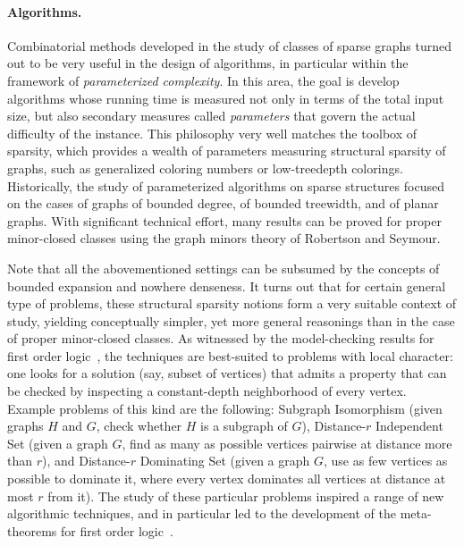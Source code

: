 \paragraph*{Algorithms.} 
Combinatorial methods developed in the study of classes of sparse graphs turned out to be very useful in the design of algorithms, in particular within the framework of {\em{parameterized complexity}}.
In this area, the goal is develop algorithms whose running time is measured not only in terms of the total input size, but also secondary measures called {\em{parameters}} that govern the actual 
difficulty of the instance. This philosophy very well matches the toolbox of sparsity, which provides a wealth of parameters measuring structural sparsity of graphs, such as generalized coloring numbers or
low-treedepth colorings. Historically, the study of parameterized algorithms on sparse structures focused on the cases of graphs of bounded degree, of bounded treewidth, and of planar graphs. 
With significant technical effort, many results can be proved for proper minor-closed classes using the graph minors theory of Robertson and Seymour. 

Note that all the abovementioned settings can be subsumed by the concepts of bounded expansion and nowhere denseness.
It turns out that for certain general type of problems, these structural sparsity notions form a very suitable context of study, yielding conceptually simpler, yet more general reasonings than 
in the case of proper minor-closed classes. As witnessed by the model-checking results for first order logic~\cite{DvorakKT13,grohe2017deciding}, the techniques are best-suited to problems with local character:
one looks for a solution (say, subset of vertices) that admits a property that can be checked by inspecting a constant-depth neighborhood of every vertex.
Example problems of this kind are the following: Subgraph Isomorphism (given graphs $H$ and $G$, check whether $H$ is a subgraph of $G$), Distance-$r$ Independent Set (given a graph $G$, find as many as possible
vertices pairwise at distance more than $r$), and Distance-$r$ Dominating Set (given a graph $G$, use as few vertices as possible to dominate it, 
where every vertex dominates all vertices at distance at most $r$ from it).
The study of these particular problems inspired a range of new algorithmic techniques, and in particular led to the development of the meta-theorems for first order logic~\cite{DvorakKT13,grohe2017deciding}.

